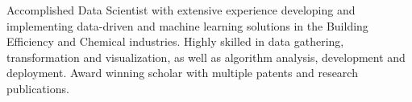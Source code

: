 

\begin{cvparagraph}

Accomplished Data Scientist with extensive experience developing and implementing data-driven and machine learning solutions in the Building Efficiency and Chemical industries. Highly skilled in data gathering, transformation and visualization, as well as algorithm analysis, development and deployment. Award winning scholar with multiple patents and research publications.

\end{cvparagraph}
